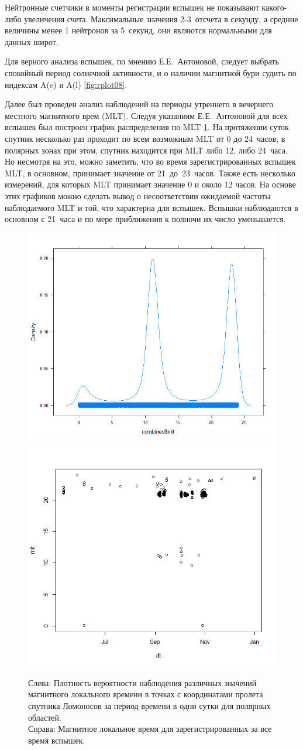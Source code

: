 Нейтронные счетчики в моменты регистрации вспышек не показывают какого-либо увеличения счета. Максимальные значения 2-3~отсчета в секунду, а средние величины менее 1 нейтронов за 5~секунд, они являются нормальными для данных широт. 

Для верного анализа вспышек, по мнению Е.Е.~Антоновой, следует выбрать спокойный период солнечной активности, и о наличии магнитной бури судить по индексам A(e) и A(l) \ref{fig:rplot08}. 

Далее был проведен анализ наблюдений на периоды утреннего в вечернего местного магнитного врем (MLT). Следуя указаниям Е.Е.~Антоновой для всех вспышек был построен график распределения по MLT \ref{fig:rplot15}. На протяжении суток спутник несколько раз проходит по всем возможным MLT от 0 до 24~часов, в полярных зонах при этом, спутник находится при MLT либо 12, либо 24~часа. Но несмотря на это, можно заметить, что во время зарегистрированных вспышек MLT, в основном, принимает значение от 21~до~23~часов. Также есть несколько измерений, для которых MLT принимает значение 0 и около 12 часов. На основе этих графиков можно сделать вывод о несоответствии ожидаемой частоты наблюдаемого MLT и той, что характерна для вспышек. Вспышки наблюдаются в основном с 21~часа и по мере приближения к полночи их число уменьшается.


\begin{figure}
	\centering
	\includegraphics[width=0.49\linewidth]{images/Flash/Rplot020}
	\includegraphics[width=0.49\linewidth, trim={0 1cm 0 0}, clip]{images/Flash/Rplot14}
	\caption{Слева: Плотность вероятности наблюдения различных значений магнитного локального времени в точках с координатами пролета спутника Ломоносов за период времени в одни сутки для полярных областей. \\Справа: Магнитное локальное время для зарегистрированных за все время вспышек.}
	\label{fig:rplot15}
\end{figure}


